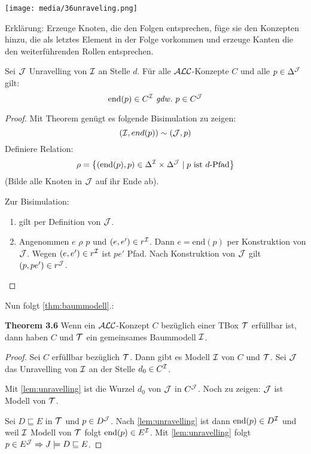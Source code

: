 \texttt{[image: media/36unraveling.png]}

Erklärung: Erzeuge Knoten, die den Folgen entsprechen, füge sie den
Konzepten hinzu, die als letztes Element in der Folge vorkommen und
erzeuge Kanten die den weiterführenden Rollen entsprechen.

\begin{lemma}[Unravelling]
    \label{lemma37}
    \label{lem:unravelling}
Sei $\mathcal{J}$ Unravelling von $\mathcal{I}$ an Stelle $d$. Für alle $\mathcal{A}\mathcal{L}\mathcal{C}$-Konzepte $C$ und alle $p \in \Delta^{\mathcal{J}}$ gilt:
\[ \text{end}\left( p \right) \in C^\MI \gdw p \in C^{\MJ} \]
\end{lemma}

\begin{tafel}
\begin{proof}
Mit Theorem genügt es folgende Bisimulation zu zeigen:
\[ \left( \MI,end\left( p \right) \right)\sim\left( \MJ,p \right) \]
Definiere Relation:
\[ \rho = \left\{ \left( \text{end}\left( p \right),p \right) \in \Delta^\MI
\times \Delta^{\MJ} \mid p\ \text{ist}\ d\text{-Pfad}\right\}
\]
(Bilde alle Knoten in $\mathcal{J}$ auf ihr Ende ab). 

Zur Bisimulation:
\begin{enumerate}
\item gilt per Definition von $\mathcal{J}$.
\item
  Angenommen $e$ $\rho$ $p$ und
  $\left( e,e' \right) \in r^\MI$. Dann $e = \text{end}\left( p \right)$
  per Konstruktion von $\mathcal{J}$. Wegen $\left( e,e' \right) \in r^\MI$
  ist $pe'$ Pfad. Nach Konstruktion von $\mathcal{J}$ gilt
  $\left( p,pe' \right) \in r^{\MJ}$.
\end{enumerate}
\end{proof}
\end{tafel}

Nun folgt \autoref{thm:baummodell}.:

\textbf{Theorem 3.6} Wenn ein $\mathcal{A}\mathcal{L}\mathcal{C}$-Konzept $C$ bezüglich einer TBox $\mathcal{T}$ erfüllbar ist, dann haben $C$ und $\mathcal{T}$ ein gemeinsames Baummodell $\mathcal{I}$.

\begin{tafel}
\begin{proof}
Sei $C$ erfüllbar bezüglich $\mathcal{T}$. Dann gibt es Modell $\mathcal{I}$ von $C$ und $\mathcal{T}$. Sei $\mathcal{J}$ das Unravelling von $\mathcal{I}$ an der Stelle
$d_0 \in C^{\mathcal{I}}$.

Mit \autoref{lem:unravelling} ist die Wurzel $d_0$ von $\mathcal{J}$ in $C^{\mathcal{J}}$. Noch zu zeigen: $\mathcal{J}$ ist Modell von $\mathcal{T}$. 

Sei $D \sqsubseteq E$ in $\mathcal{T}$ und $p \in D^{\mathcal{J}}$. Nach
\autoref{lem:unravelling} ist dann $\text{end}\left( p \right) \in D^\MI$
und weil $\mathcal{I}$ Modell von $\mathcal{T}$ folgt $\text{end}\left( p \right) \in
E^\MI$. Mit \autoref{lem:unravelling} folgt $p \in E^{\mathcal{J}}
\Rightarrow J \models D \sqsubseteq E$. %
\end{proof}
\end{tafel}

